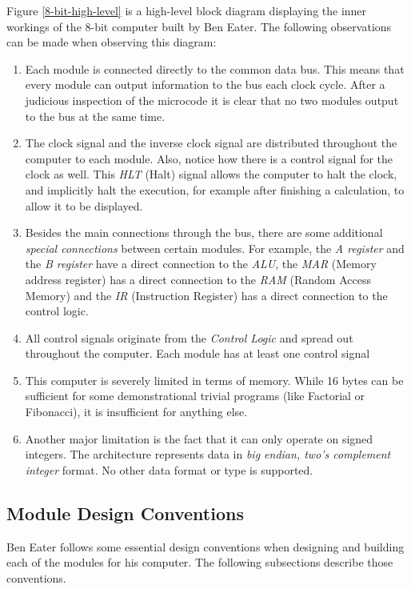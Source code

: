 Figure \ref{8-bit-high-level} is a high-level block diagram displaying the inner workings of the 8-bit computer built by Ben Eater\cite{eater2019breadboard}. The following observations can be made when observing this diagram:
\begin{enumerate}
  \item Each module is connected directly to the common data bus. This means that every module can output information to the bus each clock cycle. After a judicious inspection of the microcode\cite{eater2019microcode} it is clear that no two modules output to the bus at the same time.
  \item The clock signal and the inverse clock signal are distributed throughout the computer to each module. Also, notice how there is a control signal for the clock as well. This \emph{HLT} (Halt) signal allows the computer to halt the clock, and implicitly halt the execution, for example after finishing a calculation, to allow it to be displayed.
  \item Besides the main connections through the bus, there are some additional \emph{special connections} between certain modules. For example, the \emph{A register} and the \emph{B register} have a direct connection to the \emph{ALU}, the \emph{MAR} (Memory address register) has a direct connection to the \emph{RAM} (Random Access Memory) and the \emph{IR} (Instruction Register) has a direct connection to the control logic.
  \item All control signals originate from the \emph{Control Logic} and spread out throughout the computer. Each module has at least one control signal
  \item This computer is severely limited in terms of memory. While 16 bytes can be sufficient for some demonstrational trivial programs (like Factorial or Fibonacci), it is insufficient for anything else.
  \item Another major limitation is the fact that it can only operate on signed integers. The architecture represents data in \emph{big endian, two's complement integer} format. No other data format or type is supported.
\end{enumerate}

\subsection{Module Design Conventions}
Ben Eater follows some essential design conventions when designing and building each of the modules for his computer.
The following subsections describe those conventions.

